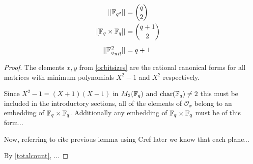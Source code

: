 \documentclass{amsart}
\begin{document}
\begin{theorem}
    \begin{align}
        |[\protect\mathbb{F}_{q^2}]|                  &= \binom{q}{2} \\
        |[\protect\mathbb{F}_q \times \protect\mathbb{F}_q]|         &= \binom{q + 1}{2} \\[0.5em]
        |[{\protect\mathbb{F}_q^2}_{nil}]|            &= q + 1
    \end{align}
\end{theorem}
\begin{proof}
The elements $x, y$ from \cref{orbitsizes} are the rational canonical forms for all matrices with minimum polynomials $X^2 - 1$ and $X^2$ respectively. 

Since $X^2 - 1 = (X + 1)(X - 1)$ in $M_2(\protect\mathbb{F}_q)$ and $\operatorname{char}(\protect\mathbb{F}_q) \neq 2$ {\color{blue} this must be included in the introductory sections}, all of the elements of $\mathcal{O}_x$ belong to an embedding of $\protect\mathbb{F}_q \times \protect\mathbb{F}_q$. Additionally any embedding of $\protect\mathbb{F}_q \times \protect\mathbb{F}_q$ must be of this form...

Now, referring to {\color{blue} cite previous lemma using Cref later} we know that each plane...

By \cref{totalcount}, ...
\end{proof}
\end{document}
